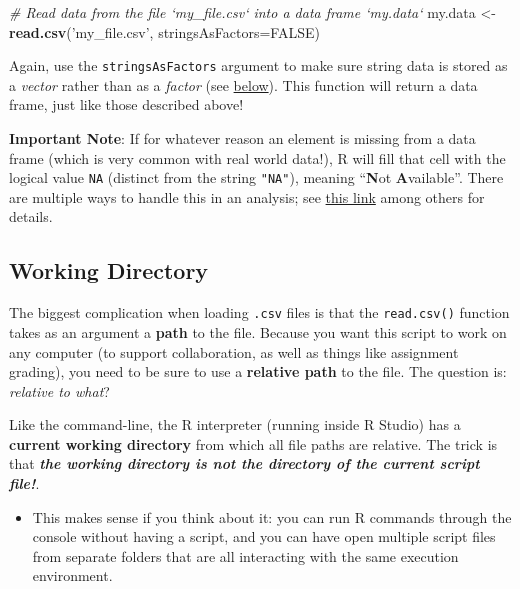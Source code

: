 \documentclass[]{book}
\newenvironment{Shaded}{\begin{snugshade}}{\end{snugshade}}
\newcommand{\KeywordTok}[1]{\textcolor[rgb]{0.13,0.29,0.53}{\textbf{#1}}}
\newcommand{\DataTypeTok}[1]{\textcolor[rgb]{0.13,0.29,0.53}{#1}}
\newcommand{\StringTok}[1]{\textcolor[rgb]{0.31,0.60,0.02}{#1}}
\newcommand{\CommentTok}[1]{\textcolor[rgb]{0.56,0.35,0.01}{\textit{#1}}}
\newcommand{\OtherTok}[1]{\textcolor[rgb]{0.56,0.35,0.01}{#1}}
\newcommand{\NormalTok}[1]{#1}
\providecommand{\tightlist}{%
  \setlength{\itemsep}{0pt}\setlength{\parskip}{0pt}}
\theoremstyle{definition}
\theoremstyle{definition}
\theoremstyle{remark}
\begin{document}
\begin{Shaded}
\begin{Highlighting}[]
\CommentTok{# Read data from the file `my_file.csv` into a data frame `my.data`}
\NormalTok{my.data <-}\StringTok{ }\KeywordTok{read.csv}\NormalTok{(}\StringTok{'my_file.csv'}\NormalTok{, }\DataTypeTok{stringsAsFactors=}\OtherTok{FALSE}\NormalTok{)}
\end{Highlighting}
\end{Shaded}

Again, use the \texttt{stringsAsFactors} argument to make sure string
data is stored as a \emph{vector} rather than as a \emph{factor} (see
\protect\hyperlink{factors}{below}). This function will return a data
frame, just like those described above!

\textbf{Important Note}: If for whatever reason an element is missing
from a data frame (which is very common with real world data!), R will
fill that cell with the logical value \texttt{NA} (distinct from the
string \texttt{"NA"}), meaning ``\textbf{N}ot \textbf{A}vailable''.
There are multiple ways to handle this in an analysis; see
\href{http://www.statmethods.net/input/missingdata.html}{this link}
among others for details.

\subsection{Working Directory}\label{working-directory}

The biggest complication when loading \texttt{.csv} files is that the
\texttt{read.csv()} function takes as an argument a \textbf{path} to the
file. Because you want this script to work on any computer (to support
collaboration, as well as things like assignment grading), you need to
be sure to use a \textbf{relative path} to the file. The question is:
\emph{relative to what}?

Like the command-line, the R interpreter (running inside R Studio) has a
\textbf{current working directory} from which all file paths are
relative. The trick is that \textbf{\emph{the working directory is not
the directory of the current script file!}}.

\begin{itemize}
\tightlist
\item
  This makes sense if you think about it: you can run R commands through
  the console without having a script, and you can have open multiple
  script files from separate folders that are all interacting with the
  same execution environment.
\end{itemize}
\end{document}

